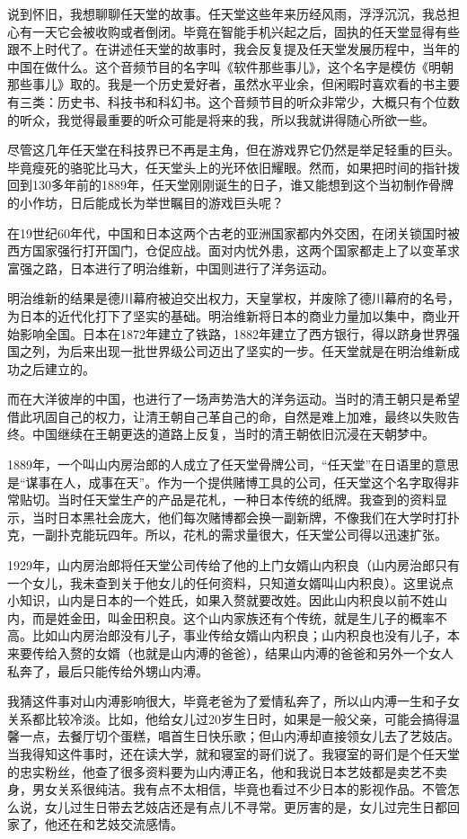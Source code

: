 \documentclass[
  letterpaper,
  DIV=11,
  numbers=noendperiod]{scrreprt}
\begin{document}
说到怀旧，我想聊聊任天堂的故事。任天堂这些年来历经风雨，浮浮沉沉，我总担心有一天它会被收购或者倒闭。毕竟在智能手机兴起之后，固执的任天堂显得有些跟不上时代了。在讲述任天堂的故事时，我会反复提及任天堂发展历程中，当年的中国在做什么。这个音频节目的名字叫《软件那些事儿》，这个名字是模仿《明朝那些事儿》取的。我是一个历史爱好者，虽然水平业余，但闲暇时喜欢看的书主要有三类：历史书、科技书和科幻书。这个音频节目的听众非常少，大概只有个位数的听众，我觉得最重要的听众可能是将来的我，所以我就讲得随心所欲一些。

尽管这几年任天堂在科技界已不再是主角，但在游戏界它仍然是举足轻重的巨头。毕竟瘦死的骆驼比马大，任天堂头上的光环依旧耀眼。然而，如果把时间的指针拨回到130多年前的1889年，任天堂刚刚诞生的日子，谁又能想到这个当初制作骨牌的小作坊，日后能成长为举世瞩目的游戏巨头呢？

在19世纪60年代，中国和日本这两个古老的亚洲国家都内外交困，在闭关锁国时被西方国家强行打开国门，仓促应战。面对内忧外患，这两个国家都走上了以变革求富强之路，日本进行了明治维新，中国则进行了洋务运动。

明治维新的结果是德川幕府被迫交出权力，天皇掌权，并废除了德川幕府的名号，为日本的近代化打下了坚实的基础。明治维新将日本的商业力量加以集中，商业开始影响全国。日本在1872年建立了铁路，1882年建立了西方银行，得以跻身世界强国之列，为后来出现一批世界级公司迈出了坚实的一步。任天堂就是在明治维新成功之后建立的。

而在大洋彼岸的中国，也进行了一场声势浩大的洋务运动。当时的清王朝只是希望借此巩固自己的权力，让清王朝自己革自己的命，自然是难上加难，最终以失败告终。中国继续在王朝更迭的道路上反复，当时的清王朝依旧沉浸在天朝梦中。

1889年，一个叫山内房治郎的人成立了任天堂骨牌公司，``任天堂''在日语里的意思是``谋事在人，成事在天''。作为一个提供赌博工具的公司，任天堂这个名字取得非常贴切。当时任天堂生产的产品是花札，一种日本传统的纸牌。我查到的资料显示，当时日本黑社会庞大，他们每次赌博都会换一副新牌，不像我们在大学时打扑克，一副扑克能玩四年。所以，花札的需求量很大，任天堂公司得以迅速扩张。

1929年，山内房治郎将任天堂公司传给了他的上门女婿山内积良（山内房治郎只有一个女儿，我未查到关于他女儿的任何资料，只知道女婿叫山内积良）。这里说点小知识，山内是日本的一个姓氏，如果入赘就要改姓。因此山内积良以前不姓山内，而是姓金田，叫金田积良。这个山内家族还有个传统，就是生儿子的概率不高。比如山内房治郎没有儿子，事业传给女婿山内积良；山内积良也没有儿子，本来要传给入赘的女婿（也就是山内溥的爸爸），结果山内溥的爸爸和另外一个女人私奔了，最后只能传给外甥山内溥。

我猜这件事对山内溥影响很大，毕竟老爸为了爱情私奔了，所以山内溥一生和子女关系都比较冷淡。比如，他给女儿过20岁生日时，如果是一般父亲，可能会搞得温馨一点，去餐厅切个蛋糕，唱首生日快乐歌；但山内溥却直接领女儿去了艺妓店。当我得知这件事时，还在读大学，就和寝室的哥们说了。我寝室的哥们是个任天堂的忠实粉丝，他查了很多资料要为山内溥正名，他和我说日本艺妓都是卖艺不卖身，男女关系很纯洁。我有点不太相信，毕竟也看过不少日本的影视作品。不管怎么说，女儿过生日带去艺妓店还是有点儿不寻常。更厉害的是，女儿过完生日都回家了，他还在和艺妓交流感情。
\end{document}
